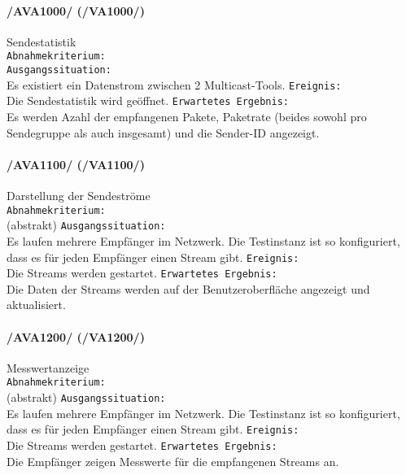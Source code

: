 \paragraph{/AVA1000/ (/VA1000/)} Sendestatistik\\ %
\texttt{Abnahmekriterium:} \\%
\texttt{Ausgangssituation:} \\Es existiert ein Datenstrom zwischen 2
Multicast-Tools.
\texttt{Ereignis:} \\Die Sendestatistik wird geöffnet.
\texttt{Erwartetes Ergebnis:} \\Es werden Azahl der empfangenen Pakete,
Paketrate (beides sowohl pro Sendegruppe als auch insgesamt) und die Sender-ID
angezeigt.

\paragraph{/AVA1100/ (/VA1100/)} Darstellung der Sendeströme\\%
\texttt{Abnahmekriterium:} \\(abstrakt)
\texttt{Ausgangssituation:} \\Es laufen mehrere Empfänger im Netzwerk. Die
Testinstanz ist so konfiguriert, dass es für jeden Empfänger einen Stream gibt.
\texttt{Ereignis:} \\Die Streams werden gestartet. 
\texttt{Erwartetes Ergebnis:} 
\\ Die Daten der Streams werden auf der Benutzeroberfläche angezeigt und
aktualisiert.

\paragraph{/AVA1200/ (/VA1200/)} Messwertanzeige\\%
\texttt{Abnahmekriterium:} \\(abstrakt)
\texttt{Ausgangssituation:} \\ Es laufen mehrere Empfänger im Netzwerk. Die
Testinstanz ist so konfiguriert, dass es für jeden Empfänger einen Stream gibt.
\texttt{Ereignis:} \\Die Streams werden gestartet.
\texttt{Erwartetes Ergebnis:} \\Die Empfänger zeigen Messwerte für die
empfangenen Streams an.


